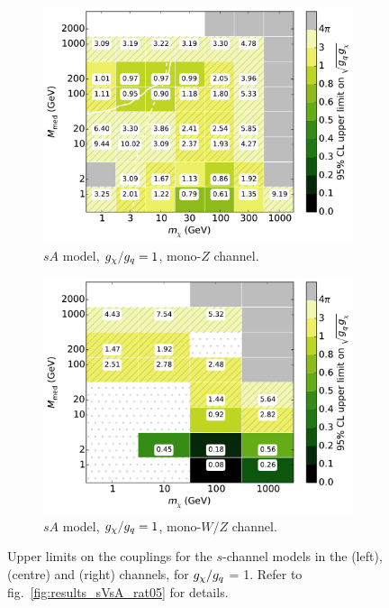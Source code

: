 \begin{figure}
\begin{subfigure}[t]{0.32\textwidth}
    \includegraphics[width=1.\textwidth]{figures/grid_allpoints_SAD_rat1.pdf}
    \caption{$sA$ model, $g_{\chi}/g_q = 1$, mono-$Z$ channel.}
  \end{subfigure}
  \begin{subfigure}[t]{0.32\textwidth}
    \centering
    \includegraphics[width=1.\textwidth]{figures/grid_basepoints_SAD_rat1_monoWZ.pdf}
    \caption{$sA$ model, $g_{\chi}/g_q = 1$, mono-$W/Z$ channel.}
  \end{subfigure}
  \caption{Upper limits on the couplings for the $s$-channel models in the \monojet (left), \monoZ (centre) and \monoWZ (right) channels, for $g_{\chi} / g_q$ = 1. Refer to fig.~\ref{fig:results_sVsA_rat05} for details.}
  \label{fig:results_sVsA_rat1}
\end{figure}

